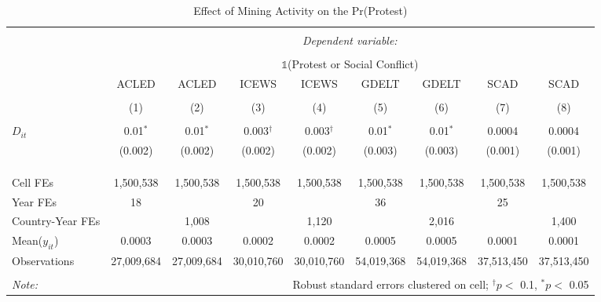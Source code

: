 
\begin{table}[ht!] \centering 
  \caption{Effect of Mining Activity on the Pr(Protest)} 
  \label{tab:did_other} 
\begin{tabular}{@{\extracolsep{0pt}}lcccccccc} 
\\[-1.8ex]\hline 
\hline \\[-1.8ex] 
 & \multicolumn{8}{c}{\textit{Dependent variable:}} \\ 
\cline{2-9} 
\\[-1.8ex] & \multicolumn{8}{c}{$\mathbb{1}$(Protest or Social Conflict)} \\ 
 & ACLED & ACLED & ICEWS & ICEWS & GDELT & GDELT & SCAD & SCAD \\ 
\\[-1.8ex] & (1) & (2) & (3) & (4) & (5) & (6) & (7) & (8)\\ 
\hline \\[-1.8ex] 
 $D_{it}$ & 0.01$^{*}$ & 0.01$^{*}$ & 0.003$^{\dagger}$ & 0.003$^{\dagger}$ & 0.01$^{*}$ & 0.01$^{*}$ & 0.0004 & 0.0004 \\ 
  & (0.002) & (0.002) & (0.002) & (0.002) & (0.003) & (0.003) & (0.001) & (0.001) \\ 
  & & & & & & & & \\ 
\hline \\[-1.8ex] 
\hline \\[-1.8ex] Cell FEs & 1,500,538 & 1,500,538 & 1,500,538 & 1,500,538 & 1,500,538 & 1,500,538 & 1,500,538 & 1,500,538 \\ 
Year FEs & 18 &  & 20 &  & 36 &  & 25 &  \\ 
Country-Year FEs &  & 1,008 &  & 1,120 &  & 2,016 &  & 1,400 \\ 
Mean($y_{it}$) & 0.0003 & 0.0003 & 0.0002 & 0.0002 & 0.0005 & 0.0005 & 0.0001 & 0.0001 \\ 
Observations & 27,009,684 & 27,009,684 & 30,010,760 & 30,010,760 & 54,019,368 & 54,019,368 & 37,513,450 & 37,513,450 \\ 
\hline 
\hline \\[-1.8ex] 
\textit{Note:}  & \multicolumn{8}{r}{Robust standard errors clustered on cell; $^{\dagger} p <$ 0.1, $^*p <$ 0.05} \\ 
\end{tabular} 
\end{table} 
